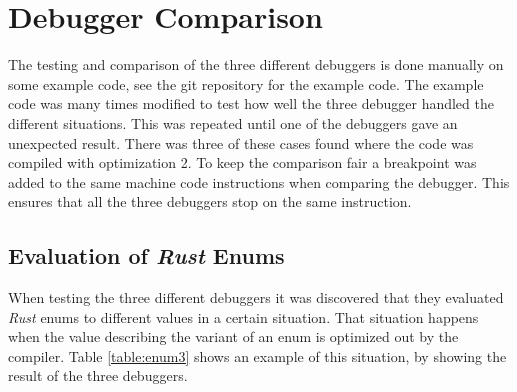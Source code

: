 \section{Debugger Comparison}
\label{sec:debuggercomparison}



The testing and comparison of the three different debuggers is done manually on some example code, see the git repository \cite{example-code} for the example code.
The example code was many times modified to test how well the three debugger handled the different situations.
This was repeated until one of the debuggers gave an unexpected result.
There was three of these cases found where the code was compiled with optimization 2.
To keep the comparison fair a breakpoint was added to the same machine code instructions when comparing the debugger.
This ensures that all the three debuggers stop on the same instruction.


\subsection{Evaluation of \emph{Rust} Enums}
When testing the three different debuggers it was discovered that they evaluated \emph{Rust} enums to different values in a certain situation.
That situation happens when the value describing the variant of an enum is optimized out by the compiler.
Table \ref{table:enum3} shows an example of this situation, by showing the result of the three debuggers.

